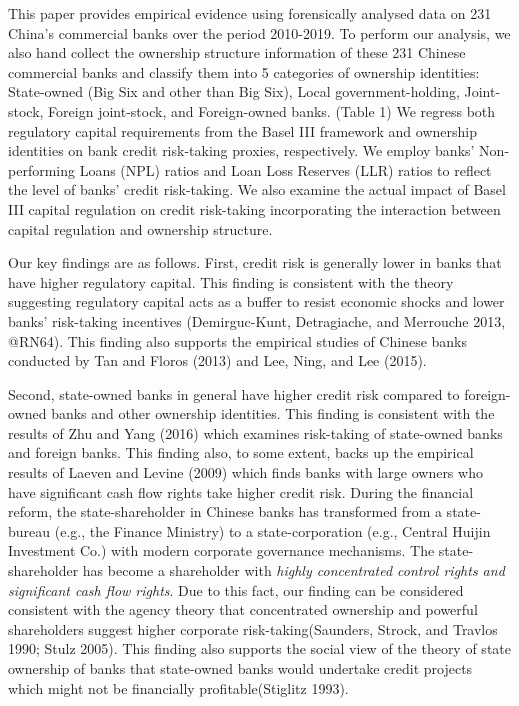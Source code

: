 \documentclass{article}
\begin{document}
This paper provides empirical evidence using forensically analysed data
on 231 China's commercial banks over the period 2010-2019. To perform
our analysis, we also hand collect the ownership structure information
of these 231 Chinese commercial banks and classify them into 5
categories of ownership identities: State-owned (Big Six and other than
Big Six), Local government-holding, Joint-stock, Foreign joint-stock,
and Foreign-owned banks. (Table 1) We regress both regulatory capital
requirements from the Basel III framework and ownership identities on
bank credit risk-taking proxies, respectively. We employ banks'
Non-performing Loans (NPL) ratios and Loan Loss Reserves (LLR) ratios to
reflect the level of banks' credit risk-taking. We also examine the
actual impact of Basel III capital regulation on credit risk-taking
incorporating the interaction between capital regulation and ownership
structure.

Our key findings are as follows. First, credit risk is generally lower
in banks that have higher regulatory capital. This finding is consistent
with the theory suggesting regulatory capital acts as a buffer to resist
economic shocks and lower banks' risk-taking incentives (Demirguc-Kunt,
Detragiache, and Merrouche 2013, @RN64). This finding also supports the
empirical studies of Chinese banks conducted by Tan and Floros (2013)
and Lee, Ning, and Lee (2015).

Second, state-owned banks in general have higher credit risk compared to
foreign-owned banks and other ownership identities. This finding is
consistent with the results of Zhu and Yang (2016) which examines
risk-taking of state-owned banks and foreign banks. This finding also,
to some extent, backs up the empirical results of Laeven and Levine
(2009) which finds banks with large owners who have significant cash
flow rights take higher credit risk. During the financial reform, the
state-shareholder in Chinese banks has transformed from a state-bureau
(e.g., the Finance Ministry) to a state-corporation (e.g., Central
Huijin Investment Co.) with modern corporate governance mechanisms. The
state-shareholder has become a shareholder with \emph{highly
concentrated control rights and significant cash flow rights}. Due to
this fact, our finding can be considered consistent with the agency
theory that concentrated ownership and powerful shareholders suggest
higher corporate risk-taking(Saunders, Strock, and Travlos 1990; Stulz
2005). This finding also supports the social view of the theory of state
ownership of banks that state-owned banks would undertake credit
projects which might not be financially profitable(Stiglitz 1993).
\end{document}
